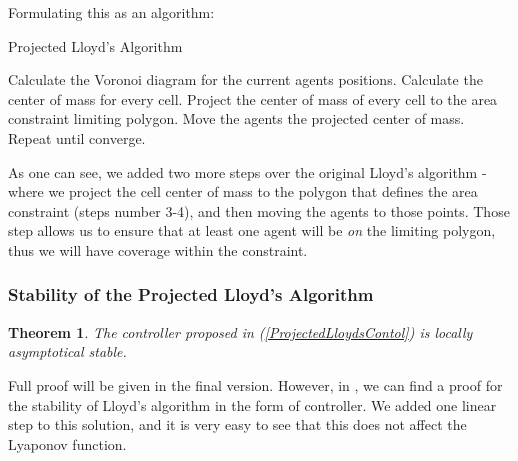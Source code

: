 \documentclass{iacas}
\newtheorem{theorem}{Theorem}
\begin{document}
Formulating this as an algorithm:
\begin{algorithm}
\caption{Projected Lloyd's Algorithm}\label{ProjLloydsAlgorithm}
\begin{algorithmic}[1]
\State Calculate the Voronoi diagram for the current agents positions.
\State Calculate the center of mass for every cell.
\State Project the center of mass of every cell to the area constraint limiting polygon.
\State Move the agents the projected center of mass.
\State Repeat until converge.
\end{algorithmic}
\end{algorithm}


As one can see, we added two more steps over the original Lloyd's algorithm - where we project the cell center of mass to the polygon that defines the area constraint (steps number 3-4), and then moving the agents to those points. Those step allows us to ensure that at least one agent will be \emph{on} the limiting polygon, thus we will have coverage within the constraint.

\subsubsection{Stability of the Projected Lloyd's Algorithm}
\begin{theorem}
The controller proposed in (\ref{ProjectedLloydsContol}) is locally asymptotical stable.
\end{theorem}

Full proof will be given in the final version. However, in \cite{Cortes2004}, we can find a proof for the stability of Lloyd's algorithm in the form of controller. We added one linear step to this solution, and it is very easy to see that this does not affect the Lyaponov function.

\end{document}
